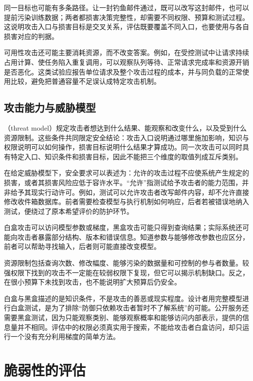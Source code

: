 同一目标也可能有多条路径。让一封钓鱼邮件通过，既可以改写这封邮件，也可以提前污染训练数据；两者都损害决策完整性，却需要不同权限、预算和测试过程。这说明攻击入口与损害目标是交叉关系，评估既要覆盖不同入口，也要使用与各自损害对应的判据。

可用性攻击还可能主要消耗资源，而不改变答案。例如，在受控测试中让请求持续占用计算、使任务陷入重复调用，可以观察队列等待、正常请求完成率和资源开销是否恶化。这类试验应报告单位请求及整个攻击过程的成本，并与同负载的正常使用比较，避免把普通容量不足误认成特定攻击机制。

\subsection{攻击能力与威胁模型}
\label{sec:security-capabilities}

（threat model）规定攻击者想达到什么结果、能观察和改变什么，以及受到什么资源限制。这些条件共同限定安全结论：攻击入口说明通过哪里施加影响，知识与权限说明可以如何操作，损害目标说明什么结果才算成功。同一次攻击可以同时具有特定入口、知识条件和损害目标，因此不能把三个维度的取值列成互斥类别。

在给定威胁模型下，安全要求可以表述为：允许的攻击过程不应使系统产生规定的损害，或者其损害风险应低于容许水平。“允许”指测试给予攻击者的能力范围，并非给予其现实行动许可。例如，测试可以允许攻击者改写邮件内容，却不允许直接修改收件箱数据库。前者需要检查模型与执行机制如何响应，后者若被错误地纳入测试，便绕过了原本希望评价的防护环节。

白盒攻击可以访问模型参数或梯度，黑盒攻击可能只得到查询结果；实际系统还可能向攻击者暴露部分结构、版本和错误信息。知道参数与能够修改参数也应区分，前者可以帮助寻找输入，后者则可能直接改变模型。

资源限制包括查询次数、修改幅度、能够污染的数据量和可控制的参与者数量。较强权限下找到的攻击不一定能在较弱权限下复现，但它可以揭示机制缺口。反之，在很小预算下未找到攻击，也不能说明扩大预算后仍安全。

白盒与黑盒描述的是知识条件，不是攻击的善恶或现实程度。设计者用完整模型进行白盒测试，是为了排除“防御只依赖攻击者暂时不了解系统”的可能。公开服务还需要黑盒测试，因为只能观察类别、能够观察概率和能够访问内部表示，提供的信息量并不相同。评估中的权限必须真实用于搜索，不能给攻击者白盒访问，却只运行一个没有充分利用梯度的简单方法。

\section{脆弱性的评估}
\label{sec:security-evaluation}

